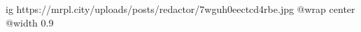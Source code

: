  
 
 
 
 

\ifcmt
  ig https://mrpl.city/uploads/posts/redactor/7wguh0eectcd4rbe.jpg
  @wrap center
  @width 0.9
\fi
